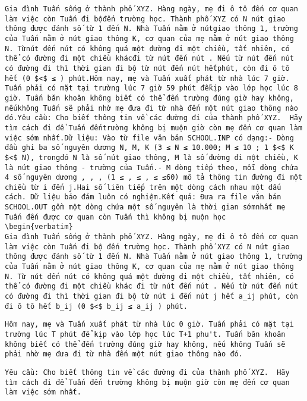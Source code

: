 
\begin{verbatim}
Gia đình Tuấn sống ở thành phố XYZ. Hàng ngày, mẹ đi ô tô đến cơ quan làm việc còn Tuấn đi bộđến trường học. Thành phố XYZ có N nút giao thông được đánh số từ 1 đến N. Nhà Tuấn nằm ở nútgiao thông 1, trường của Tuấn nằm ở nút giao thông K, cơ quan của mẹ nằm ở nút giao thông N. Từnút đến nút có không quá một đường đi một chiều, tất nhiên, có thể có đường đi một chiều khácđi từ nút đến nút . Nếu từ nút đến nút có đường đi thì thời gian đi bộ từ nút đến nút hếtphút, còn đi ô tô hết (0 $<$ ≤ ) phút.Hôm nay, mẹ và Tuấn xuất phát từ nhà lúc 7 giờ. Tuấn phải có mặt tại trường lúc 7 giờ 59 phút đểkịp vào lớp học lúc 8 giờ. Tuấn băn khoăn không biết có thể đến trường đúng giờ hay không, nếukhông Tuấn sẽ phải nhờ mẹ đưa đi từ nhà đến một nút giao thông nào đó.Yêu cầu: Cho biết thông tin về các đường đi của thành phố XYZ.  Hãy tìm cách đi để Tuấn đếntrường không bị muộn giờ còn mẹ đến cơ quan làm việc sớm nhất.Dữ liệu: Vào từ file văn bản SCHOOL.INP có dạng:- Dòng đầu ghi ba số nguyên dương N, M, K (3 ≤ N ≤ 10.000; M ≤ 10 ; 1 $<$ K $<$ N), trongđó N là số nút giao thông, M là số đường đi một chiều, K là nút giao thông - trường của Tuấn.- M dòng tiếp theo, mỗi dòng chứa 4 số nguyên dương , , , (1 ≤ , ≤ , ≤ ≤60) mô tả thông tin đường đi một chiều từ i đến j.Hai số liên tiếp trên một dòng cách nhau một dấu cách. Dữ liệu bảo đảm luôn có nghiệm.Kết quả: Đưa ra file văn bản SCHOOL.OUT gồm một dòng chứa một số nguyên là thời gian sớmnhất mẹ Tuấn đến được cơ quan còn Tuấn thì không bị muộn học
\begin{verbatim}
Gia đình Tuấn sống ở thành phố XYZ. Hàng ngày, mẹ đi ô tô đến cơ quan làm việc còn Tuấn đi bộ đến trường học. Thành phố XYZ có N nút giao thông được đánh số từ 1 đến N. Nhà Tuấn nằm ở nút giao thông 1, trường của Tuấn nằm ở nút giao thông K, cơ quan của mẹ nằm ở nút giao thông N. Từ nút đến nút có không quá một đường đi một chiều, tất nhiên, có thể có đường đi một chiều khác đi từ nút đến nút . Nếu từ nút đến nút có đường đi thì thời gian đi bộ từ nút i đến nút j hết a_ij phút, còn đi ô tô hết b_ij (0 $<$ b_ij ≤ a_ij ) phút.\end{verbatim}
\begin{verbatim}
Hôm nay, mẹ và Tuấn xuất phát từ nhà lúc 0 giờ. Tuấn phải có mặt tại trường lúc T phút để kịp vào lớp học lúc T+1 phu't. Tuấn băn khoăn không biết có thể đến trường đúng giờ hay không, nếu không Tuấn sẽ phải nhờ mẹ đưa đi từ nhà đến một nút giao thông nào đó. \end{verbatim}
\begin{verbatim}
Yêu cầu: Cho biết thông tin về các đường đi của thành phố XYZ.  Hãy tìm cách đi để Tuấn đến trường không bị muộn giờ còn mẹ đến cơ quan làm việc sớm nhất.\end{verbatim}
